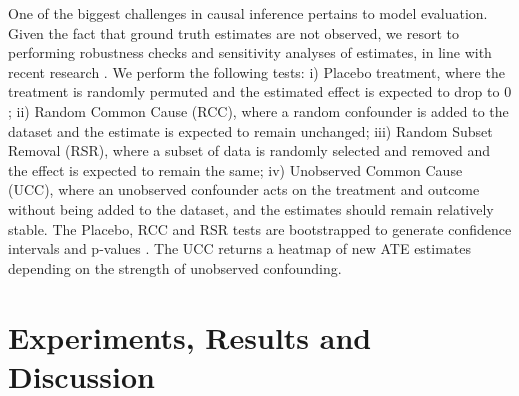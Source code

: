 \documentclass[letterpaper]{article} %
\begin{document}
One of the biggest challenges in causal inference pertains to model evaluation. Given the fact that ground truth estimates are not observed, we resort to performing robustness checks and sensitivity analyses of estimates, in line with recent research \cite{sharma2020dowhy, cinelli2020making}. We perform the following tests: i) Placebo treatment, where the treatment is randomly permuted and the estimated effect is expected to drop to $0$; ii) Random Common Cause (RCC), where a random confounder is added to the dataset and the estimate is expected to remain unchanged; iii) Random Subset Removal (RSR), where a subset of data is randomly selected and removed and the effect is expected to remain the same; iv) Unobserved Common Cause (UCC), where an unobserved confounder acts on the treatment and outcome without being added to the dataset, and the estimates should remain relatively stable. The Placebo, RCC and RSR tests are bootstrapped to generate confidence intervals and p-values \cite{diciccio1996bootstrap}. The UCC returns a heatmap of new ATE estimates depending on the strength of unobserved confounding.

\section{Experiments, Results and Discussion}
\end{document}
